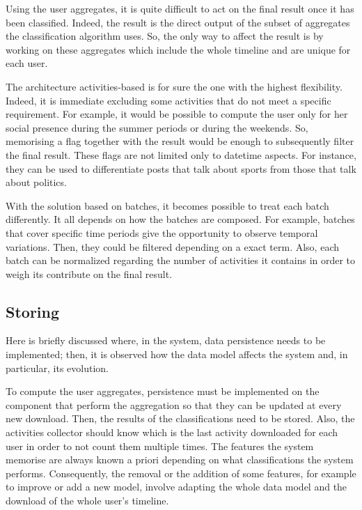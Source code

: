 Using the user aggregates, it is quite difficult to act on the final result once it has been classified.
Indeed, the result is the direct output of the subset of aggregates the classification algorithm uses. So, the only way to affect the result is by working on these aggregates which include the whole timeline and are unique for each user.

The architecture activities-based is for sure the one with the highest flexibility. Indeed, it is immediate excluding some activities that do not meet a specific requirement.
For example, it would be possible to compute the user only for her social presence during the summer periods or during the weekends. 
So, memorising a flag together with the result would be enough to subsequently filter the final result.
These flags are not limited only to datetime aspects. For instance, they can be used to differentiate posts that talk about sports from those that talk about politics.

With the solution based on batches, it becomes possible to treat each batch differently. It all depends on how the batches are composed.
For example, batches that cover specific time periods give the opportunity to observe temporal variations. Then, they could be filtered depending on a exact term.
Also, each batch can be normalized regarding the number of activities it contains in order to weigh its contribute on the final result.


\subsection{Storing}
Here is briefly discussed where, in the system, data persistence needs to be implemented;
then, it is observed how the data model affects the system and, in particular, its evolution.

To compute the user aggregates, persistence must be implemented on the component that perform the aggregation so that they can be updated at every new download.
Then, the results of the classifications need to be stored. Also, the activities collector should know which is the last activity downloaded for each user in order to not count them multiple times.
The features the system memorise are always known a priori depending on what classifications the system performs. Consequently, the removal or the addition of some features, for example to improve or add a new model, involve adapting the whole data model and the download of the whole user's timeline.

